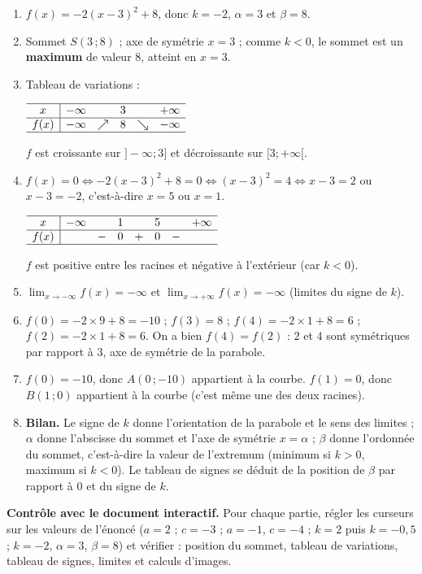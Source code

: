 \documentclass[11pt,a4paper]{article}
\begin{document}
\begin{enumerate}[leftmargin=1.4em,itemsep=3pt]
  \item $f(x)=-2(x-3)^2+8$, donc $k=-2$, $\alpha=3$ et $\beta=8$.

  \item Sommet $S(3\,;8)$ ; axe de symétrie $x=3$ ; comme $k<0$, le sommet est un \textbf{maximum}
  de valeur $8$, atteint en $x=3$.

  \item Tableau de variations :
  \begin{center}
  $\begin{array}{c|ccccc}
  \hline
  x & -\infty & & 3 & & +\infty\\ \hline
  f(x) & -\infty & \nearrow & 8 & \searrow & -\infty\\ \hline
  \end{array}$
  \end{center}
  $f$ est croissante sur $]-\infty;3]$ et décroissante sur $[3;+\infty[$.

  \item $f(x)=0\iff -2(x-3)^2+8=0\iff (x-3)^2=4\iff x-3=2$ ou $x-3=-2$,
  c'est-à-dire $x=5$ ou $x=1$.
  \begin{center}
  $\begin{array}{c|ccccccc}
  \hline
  x & -\infty & & 1 & & 5 & & +\infty\\ \hline
  f(x) & & - & 0 & + & 0 & - & \\ \hline
  \end{array}$
  \end{center}
  $f$ est positive entre les racines et négative à l'extérieur (car $k<0$).

  \item $\displaystyle\lim_{x\to-\infty}f(x)=-\infty$ et $\displaystyle\lim_{x\to+\infty}f(x)=-\infty$
  (limites du signe de $k$).

  \item $f(0)=-2\times 9+8=-10$ ; $f(3)=8$ ; $f(4)=-2\times 1+8=6$ ; $f(2)=-2\times 1+8=6$.
  On a bien $f(4)=f(2)$ : $2$ et $4$ sont symétriques par rapport à $3$, axe de symétrie de la parabole.

  \item $f(0)=-10$, donc $A(0\,;-10)$ appartient à la courbe.
  $f(1)=0$, donc $B(1\,;0)$ appartient à la courbe (c'est même une des deux racines).

  \item \textbf{Bilan.} Le signe de $k$ donne l'orientation de la parabole et le sens des limites ;
  $\alpha$ donne l'abscisse du sommet et l'axe de symétrie $x=\alpha$ ; $\beta$ donne l'ordonnée du sommet,
  c'est-à-dire la valeur de l'extremum (minimum si $k>0$, maximum si $k<0$). Le tableau de signes se déduit
  de la position de $\beta$ par rapport à $0$ et du signe de $k$.
\end{enumerate}

\begin{corrbox}
\textbf{Contrôle avec le document interactif.} Pour chaque partie, régler les curseurs sur les valeurs
de l'énoncé ($a=2$ ; $c=-3$ ; $a=-1$, $c=-4$ ; $k=2$ puis $k=-0{,}5$ ; $k=-2$, $\alpha=3$, $\beta=8$)
et vérifier : position du sommet, tableau de variations, tableau de signes, limites et calculs d'images.
\end{corrbox}
\end{document}
